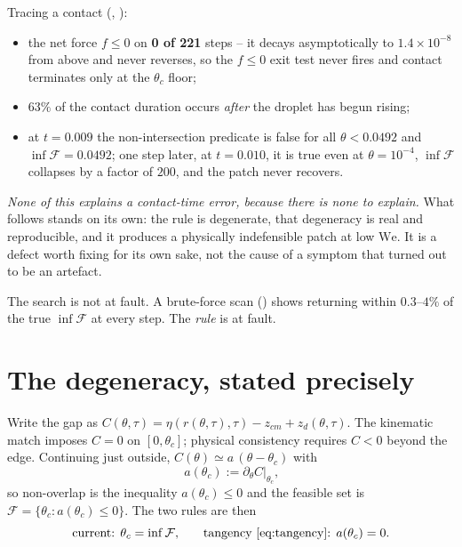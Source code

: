\documentclass[11pt]{article}
\newcommand{\We}{\mathrm{We}}
\begin{document}
Tracing a contact (, ):

\begin{itemize}
  \item the net force $f\le0$ on \textbf{0 of 221} steps -- it decays asymptotically to
        $1.4\times10^{-8}$ from above and never reverses, so the $f\le0$ exit test never fires
        and contact terminates only at the $\theta_c$ floor;
  \item $63\%$ of the contact duration occurs \emph{after} the droplet has begun rising;
  \item at $t=0.009$ the non-intersection predicate is false for all $\theta<0.0492$ and
        $\inf\mathcal F=0.0492$; one step later, at $t=0.010$, it is true even at
        $\theta=10^{-4}$, $\inf\mathcal F$ collapses by a factor of $200$, and the patch never
        recovers.
\end{itemize}

\emph{None of this explains a contact-time error, because there is none to explain.} What follows
stands on its own: the rule is degenerate, that degeneracy is real and reproducible, and it
produces a physically indefensible patch at low $\We$. It is a defect worth fixing for its own
sake, not the cause of a symptom that turned out to be an artefact.

The search is not at fault. A brute-force scan () shows
 returning within $0.3$--$4\%$ of the true $\inf\mathcal F$ at every step.
The \emph{rule} is at fault.

\section{The degeneracy, stated precisely}
\label{sec:degeneracy}

Write the gap as $C(\theta,\tau)=\eta(r(\theta,\tau),\tau)-z_{cm}+z_d(\theta,\tau)$. The
kinematic match imposes $C=0$ on $[0,\theta_c]$; physical consistency requires $C<0$ beyond the
edge. Continuing just outside, $C(\theta)\simeq a\,(\theta-\theta_c)$ with
\begin{equation}
  a(\theta_c) := \partial_\theta C\big|_{\theta_c}\text{,}
\end{equation}
so non-overlap is the inequality $a(\theta_c)\le0$ and the feasible set is
$\mathcal F=\{\theta_c: a(\theta_c)\le0\}$. The two rules are then
\begin{equation}
  \text{current: } \theta_c=\inf\mathcal F\text{,}\qquad
  \text{tangency \eqref{eq:tangency}: } a(\theta_c)=0\text{.}
\end{equation}
\end{document}
